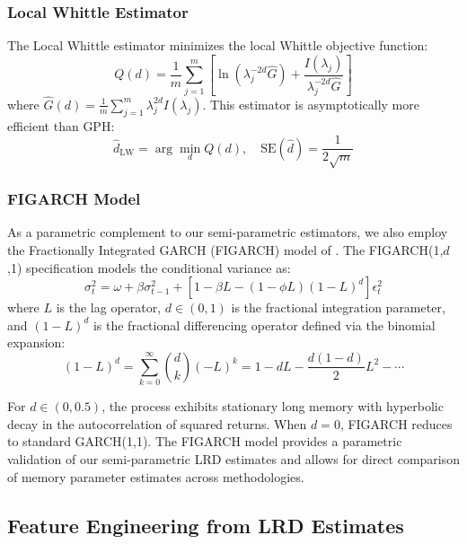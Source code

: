 \documentclass[12pt,a4paper]{article}
\begin{document}
\subsubsection{Local Whittle Estimator}

The Local Whittle estimator \citep{robinson1995gaussian} minimizes the local Whittle objective function:
\begin{equation}
    Q(d) = \frac{1}{m}\sum_{j=1}^m \left[\ln(\lambda_j^{-2d} \hat{G}) + \frac{I(\lambda_j)}{\lambda_j^{-2d}\hat{G}}\right]
\end{equation}
where $\hat{G}(d) = \frac{1}{m}\sum_{j=1}^m \lambda_j^{2d} I(\lambda_j)$. This estimator is asymptotically more efficient than GPH:
\begin{equation}
    \hat{d}_{\text{LW}} = \arg\min_d Q(d), \quad \text{SE}(\hat{d}) = \frac{1}{2\sqrt{m}}
\end{equation}

\subsubsection{FIGARCH Model}

As a parametric complement to our semi-parametric estimators, we also employ the Fractionally Integrated GARCH (FIGARCH) model of \citet{baillie1996figarch}. The FIGARCH(1,$d$,1) specification models the conditional variance as:
\begin{equation}
    \sigma_t^2 = \omega + \beta \sigma_{t-1}^2 + \left[1 - \beta L - (1-\phi L)(1-L)^d\right] \epsilon_t^2
\end{equation}
where $L$ is the lag operator, $d \in (0, 1)$ is the fractional integration parameter, and $(1-L)^d$ is the fractional differencing operator defined via the binomial expansion:
\begin{equation}
    (1-L)^d = \sum_{k=0}^{\infty} \binom{d}{k} (-L)^k = 1 - dL - \frac{d(1-d)}{2}L^2 - \cdots
\end{equation}

For $d \in (0, 0.5)$, the process exhibits stationary long memory with hyperbolic decay in the autocorrelation of squared returns. When $d = 0$, FIGARCH reduces to standard GARCH(1,1). The FIGARCH model provides a parametric validation of our semi-parametric LRD estimates and allows for direct comparison of memory parameter estimates across methodologies.

\subsection{Feature Engineering from LRD Estimates}
\end{document}
